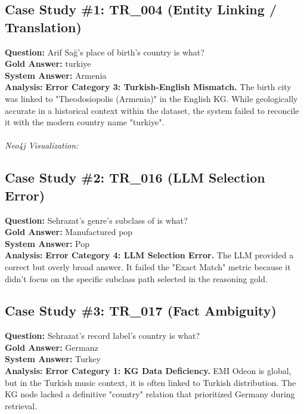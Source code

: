 \documentclass{article}
\begin{document}
\subsection{Case Study \#1: TR\_004 (Entity Linking / Translation)}
\textbf{Question:} Arif Sağ's place of birth's country is what? \\
\textbf{Gold Answer:} turkiye \\
\textbf{System Answer:} Armenia \\
\textbf{Analysis:} \textbf{Error Category 3: Turkish-English Mismatch.} The birth city was linked to "Theodosiopolis (Armenia)" in the English KG. While geologically accurate in a historical context within the dataset, the system failed to reconcile it with the modern country name "turkiye".
\\ \\
\textit{Neo4j Visualization:}
\begin{center}
\end{center}

\subsection{Case Study \#2: TR\_016 (LLM Selection Error)}
\textbf{Question:} Sehrazat's genre's subclass of is what? \\
\textbf{Gold Answer:} Manufactured pop \\
\textbf{System Answer:} Pop \\
\textbf{Analysis:} \textbf{Error Category 4: LLM Selection Error.} The LLM provided a correct but overly broad answer. It failed the "Exact Match" metric because it didn't focus on the specific subclass path selected in the reasoning gold.

\subsection{Case Study \#3: TR\_017 (Fact Ambiguity)}
\textbf{Question:} Sehrazat's record label's country is what? \\
\textbf{Gold Answer:} Germanz \\
\textbf{System Answer:} Turkey \\
\textbf{Analysis:} \textbf{Error Category 1: KG Data Deficiency.} EMI Odeon is global, but in the Turkish music context, it is often linked to Turkish distribution. The KG node lacked a definitive "country" relation that prioritized Germany during retrieval.
\end{document}
